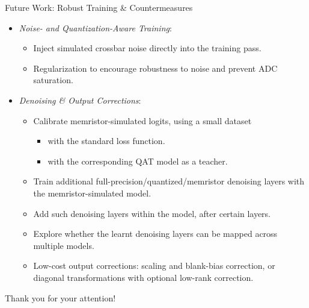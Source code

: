 \documentclass[xcolor=table,mathserif,9pt,usepdftitle=false]{beamer}    %
\begin{document}
\begin{frame}{Future Work: Robust Training \& Countermeasures}
  \begin{itemize}
    \setlength{\itemsep}{10pt}
    \item \emph{Noise- and Quantization-Aware Training}:
          \begin{itemize}
            \item Inject simulated crossbar noise directly into the training pass.
            \item Regularization to encourage robustness to noise and prevent ADC saturation.
          \end{itemize}
    \item \emph{Denoising \& Output Corrections}:
          \begin{itemize}
            \item Calibrate memristor-simulated logits, using a small dataset
            \begin{itemize}
              \item[$\rightarrow$] with the standard loss function.
              \item[$\rightarrow$] with the corresponding QAT model as a teacher.
            \end{itemize}
            \item Train additional full-precision/quantized/memristor denoising layers with the memristor-simulated model.
            \item Add such denoising layers within the model, after certain layers.
            \item Explore whether the learnt denoising layers can be mapped across multiple models.
            \item Low-cost output corrections: scaling and blank-bias correction, or diagonal transformations with optional low-rank correction.
          \end{itemize}
  \end{itemize}
\end{frame}


\begin{frame}[label=thankYouSlide]
  \vfill
  \begin{center}
    {\Large \textcolor{i6bluedark}{Thank you for your attention!}}
  \end{center}
  \vfill
\end{frame}
\end{document}
